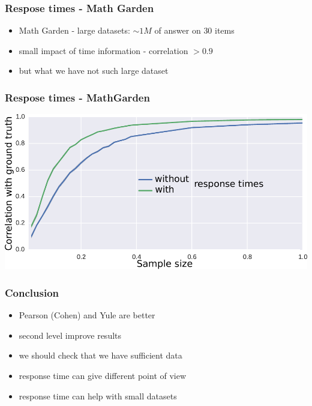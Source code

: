 \documentclass[xcolor=svgnames]{beamer}
\begin{document}
\begin{frame}
    \frametitle{Respose times - Math Garden}
    \begin{itemize}
        \item Math Garden - large datasets: $\sim 1M$ of answer on $30$ items
        \item small impact of time information - correlation $>0.9$
        \item but what we have not such large dataset

    \end{itemize}
\end{frame}
\begin{frame}
    \frametitle{Respose times - MathGarden}
    \centering
    \includegraphics[width=\linewidth]{figures/measure-convergence-time}
\end{frame}
\begin{frame}
    \frametitle{Conclusion}
    \Large
    \begin{itemize}
        \item Pearson (Cohen) and Yule are better
        \item second level improve results
        \item we should check that we have sufficient data
        \item response time can give different point of view
        \item response time can help with small datasets
    \end{itemize}
\end{frame}
\end{document}
